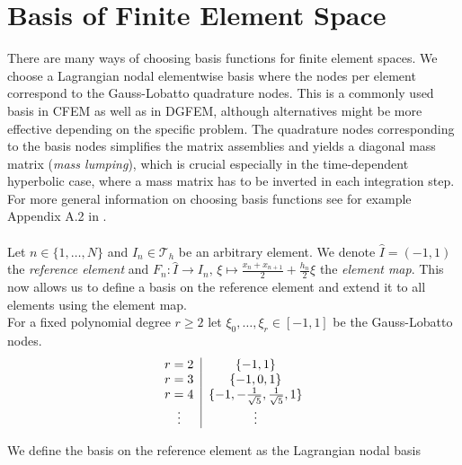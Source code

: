 \section{Basis of Finite Element Space}
\label{sec:ell_basis}
There are many ways of choosing basis functions for finite element spaces. We choose a Lagrangian 
nodal elementwise basis where the nodes per element correspond to the Gauss-Lobatto quadrature nodes.
This is a commonly used basis in CFEM as well as in DGFEM, although alternatives might be more
effective depending on the specific problem. The quadrature nodes
corresponding to the basis nodes simplifies the matrix assemblies and yields a diagonal mass matrix (\textit{mass lumping}), which 
is crucial especially in the time-dependent hyperbolic case, where a mass matrix has to be inverted 
in each integration step. For more general information on choosing basis functions see for example 
Appendix A.2 in \cite{diPietro2012}. \\ \\
Let $n\in \{1,\ldots,N\}$ and $I_n \in \mathcal{T}_h$ be an arbitrary element. 
We denote $\hat{I} = (-1,1)$ the \textit{reference element} and $\displaystyle F_n : \hat{I} \to I_n, \, \xi \mapsto \frac{x_n + x_{n+1}}{2} + \frac{h_n}{2} \xi $
the \textit{element map}. This now allows us to define a basis on the reference element and 
extend it to all elements using the element map. \\
For a fixed polynomial degree $r \geq 2$ let $\xi_0,\ldots,\xi_{r} \in [-1,1]$ be the
Gauss-Lobatto nodes. \\
\begin{equation*}
    \begin{tabular}{c|c}
    \centering
    $r = 2$ & $\{-1, 1\}$ \\
    $r = 3$ & $\{-1,0, 1\}$ \\
    $r = 4$ & $\{-1,-\frac{1}{\sqrt{5}}, \frac{1}{\sqrt{5}}, 1\}$ \\
    \vdots  & \vdots \\
\end{tabular} 
\end{equation*}

We define the basis on the reference element as the Lagrangian nodal basis

